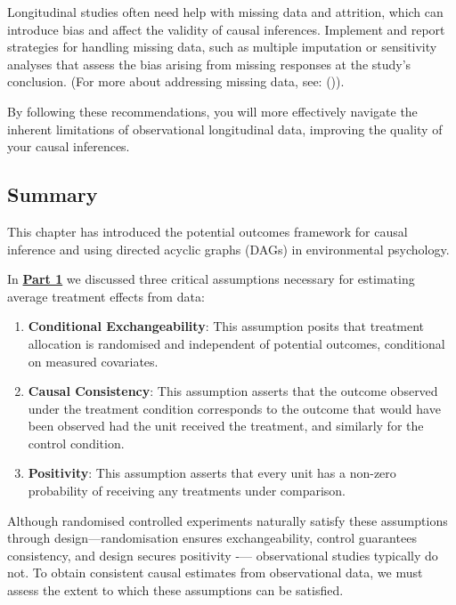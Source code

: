 \documentclass[
  singlecolumn]{article}
\providecommand{\tightlist}{%
  \setlength{\itemsep}{0pt}\setlength{\parskip}{0pt}}\usepackage{longtable,booktabs,array}
\begin{document}
Longitudinal studies often need help with missing data and attrition,
which can introduce bias and affect the validity of causal inferences.
Implement and report strategies for handling missing data, such as
multiple imputation or sensitivity analyses that assess the bias arising
from missing responses at the study's conclusion. (For more about
addressing missing data, see:
()).

By following these recommendations, you will more effectively navigate
the inherent limitations of observational longitudinal data, improving
the quality of your causal inferences.

\subsection{Summary}\label{summary}

This chapter has introduced the potential outcomes framework for causal
inference and using directed acyclic graphs (DAGs) in environmental
psychology.

In \hyperref[section-part1]{\textbf{Part 1}} we discussed three critical
assumptions necessary for estimating average treatment effects from
data:

\begin{enumerate}
\def\labelenumi{\arabic{enumi}.}
\tightlist
\item
  \textbf{Conditional Exchangeability}: This assumption posits that
  treatment allocation is randomised and independent of potential
  outcomes, conditional on measured covariates.
\item
  \textbf{Causal Consistency}: This assumption asserts that the outcome
  observed under the treatment condition corresponds to the outcome that
  would have been observed had the unit received the treatment, and
  similarly for the control condition.
\item
  \textbf{Positivity}: This assumption asserts that every unit has a
  non-zero probability of receiving any treatments under comparison.
\end{enumerate}

Although randomised controlled experiments naturally satisfy these
assumptions through design---randomisation ensures exchangeability,
control guarantees consistency, and design secures positivity -\/---
observational studies typically do not. To obtain consistent causal
estimates from observational data, we must assess the extent to which
these assumptions can be satisfied.
\end{document}
